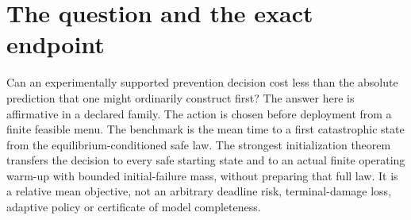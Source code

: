 \documentclass[11pt,a4paper]{article}
\begin{document}
\begin{abstract}
At fixed degree, contrast, accuracy and confidence, coarse acquisition costs $\widetilde O(N)$ local services; the subsequent decision uses $O(K)$ boundary experiments in the certified boundary regime, or $O(K\operatorname{polylog}N)$ updates in the return regime, with accuracy and confidence factors explicit. In the same local experimental access model, absolute relative lifetime prediction requires $\Omega(N^2)$ total local information even for independent components with fast known clocks. This is a separation from forecasting, not a universal lower bound against specialist direct-decision methods. Actual pin, field, detector, timing, repeated-cell, preparation and deployment services remain priced, including the difference between whole-system wall time and summed component exposure. No economical general device or historical priority is claimed. Independent continuous completion design, exact assignment decisions, and controlled quantum export without Hamiltonian learning are retained separately.
\end{abstract}
\tableofcontents
\newpage
\section{The question and the exact endpoint}
Can an experimentally supported prevention decision cost less than the absolute prediction that one might ordinarily construct first? The answer here is affirmative in a declared family. The action is chosen before deployment from a finite feasible menu. The benchmark is the mean time to a first catastrophic state from the equilibrium-conditioned safe law. The strongest initialization theorem transfers the decision to every safe starting state and to an actual finite operating warm-up with bounded initial-failure mass, without preparing that full law. It is a relative mean objective, not an arbitrary deadline risk, terminal-damage loss, adaptive policy or certificate of model completeness.
\end{document}
